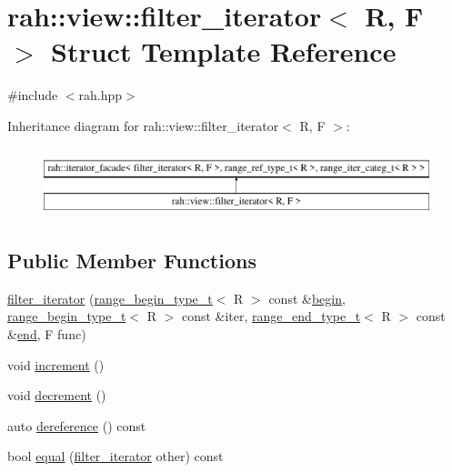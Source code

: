 \hypertarget{structrah_1_1view_1_1filter__iterator}{}\section{rah\+::view\+::filter\+\_\+iterator$<$ R, F $>$ Struct Template Reference}
\label{structrah_1_1view_1_1filter__iterator}


{\ttfamily \#include $<$rah.\+hpp$>$}

Inheritance diagram for rah\+::view\+::filter\+\_\+iterator$<$ R, F $>$\+:\begin{figure}[H]
\begin{center}
\leavevmode
\includegraphics[height=1.996435cm]{structrah_1_1view_1_1filter__iterator}
\end{center}
\end{figure}
\subsection*{Public Member Functions}
\begin{DoxyCompactItemize}
\item 
\mbox{\hyperlink{structrah_1_1view_1_1filter__iterator_a31543c024a816c4f3e8fc8937b2a9214}{filter\+\_\+iterator}} (\mbox{\hyperlink{namespacerah_a28aff4eeddcece6be65ff0b956d32d4a}{range\+\_\+begin\+\_\+type\+\_\+t}}$<$ R $>$ const \&\mbox{\hyperlink{namespacerah_a2c4a19e57cc4e0753e93830f247def6d}{begin}}, \mbox{\hyperlink{namespacerah_a28aff4eeddcece6be65ff0b956d32d4a}{range\+\_\+begin\+\_\+type\+\_\+t}}$<$ R $>$ const \&iter, \mbox{\hyperlink{namespacerah_a9657e24ae477f4482225b133fe286b65}{range\+\_\+end\+\_\+type\+\_\+t}}$<$ R $>$ const \&\mbox{\hyperlink{namespacerah_aaddd1442cd76b96876e692cdefe7261d}{end}}, F func)
\item 
void \mbox{\hyperlink{structrah_1_1view_1_1filter__iterator_a63278a452be5e546e6fb3aa0b1a90bfb}{increment}} ()
\item 
void \mbox{\hyperlink{structrah_1_1view_1_1filter__iterator_aed445498ffbec0c3e782ddc17314b677}{decrement}} ()
\item 
auto \mbox{\hyperlink{structrah_1_1view_1_1filter__iterator_a04ce8bb8bb607b986e692f8e39bed6e3}{dereference}} () const
\item 
bool \mbox{\hyperlink{structrah_1_1view_1_1filter__iterator_a4ab0c322842146d3011ae7c88deb82f7}{equal}} (\mbox{\hyperlink{structrah_1_1view_1_1filter__iterator}{filter\+\_\+iterator}} other) const
\end{DoxyCompactItemize}
